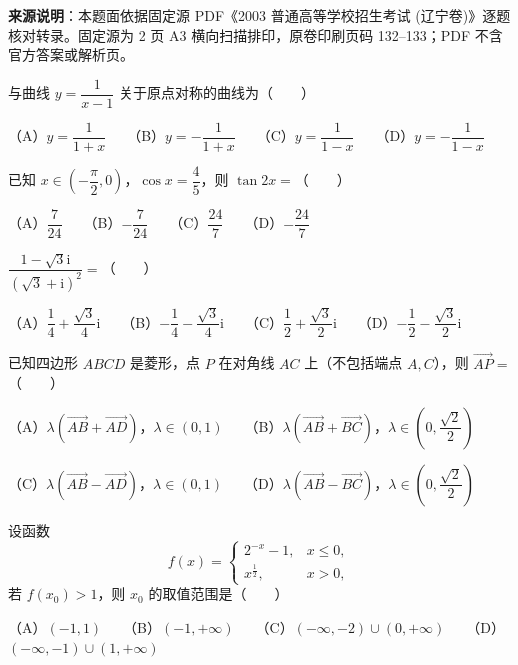 

\begin{gktip}
\textbf{来源说明}：本题面依据固定源 PDF《2003 普通高等学校招生考试 (辽宁卷)》逐题核对转录。固定源为 2 页 A3 横向扫描排印，原卷印刷页码 132–133；PDF 不含官方答案或解析页。
\end{gktip}

\begin{question}
与曲线 $y = \dfrac{1}{x-1}$ 关于原点对称的曲线为\mbox{（　　）}

（A）$y = \dfrac{1}{1+x}$　　（B）$y = -\dfrac{1}{1+x}$　　（C）$y = \dfrac{1}{1-x}$　　（D）$y = -\dfrac{1}{1-x}$

\end{question}
\begin{question}
已知 $x \in \left(-\dfrac{\pi}{2}, 0\right)$，$\cos x = \dfrac{4}{5}$，则 $\tan 2x =$\mbox{（　　）}

（A）$\dfrac{7}{24}$　　（B）$-\dfrac{7}{24}$　　（C）$\dfrac{24}{7}$　　（D）$-\dfrac{24}{7}$

\end{question}
\begin{question}
$\dfrac{1 - \sqrt{3}\mathrm{i}}{(\sqrt{3} + \mathrm{i})^2} =$\mbox{（　　）}

（A）$\dfrac{1}{4} + \dfrac{\sqrt{3}}{4}\mathrm{i}$　　（B）$-\dfrac{1}{4} - \dfrac{\sqrt{3}}{4}\mathrm{i}$　　（C）$\dfrac{1}{2} + \dfrac{\sqrt{3}}{2}\mathrm{i}$　　（D）$-\dfrac{1}{2} - \dfrac{\sqrt{3}}{2}\mathrm{i}$

\end{question}
\begin{question}
已知四边形 $ABCD$ 是菱形，点 $P$ 在对角线 $AC$ 上（不包括端点 $A, C$），则 $\vec{AP} =$\mbox{（　　）}

（A）$\lambda(\vec{AB} + \vec{AD})$，$\lambda \in (0, 1)$　　（B）$\lambda(\vec{AB} + \vec{BC})$，$\lambda \in \left(0, \dfrac{\sqrt{2}}{2}\right)$

（C）$\lambda(\vec{AB} - \vec{AD})$，$\lambda \in (0, 1)$　　（D）$\lambda(\vec{AB} - \vec{BC})$，$\lambda \in \left(0, \dfrac{\sqrt{2}}{2}\right)$

\end{question}
\begin{question}
设函数
\nopagebreak[4]
\[f(x) = \begin{cases} 2^{-x} - 1, & x \le 0, \\ x^{\frac{1}{2}}, & x > 0, \end{cases}\]
若 $f(x_0) > 1$，则 $x_0$ 的取值范围是\mbox{（　　）}

（A）$(-1, 1)$　　（B）$(-1, +\infty)$　　（C）$(-\infty, -2) \cup (0, +\infty)$　　（D）$(-\infty, -1) \cup (1, +\infty)$

\end{question}
